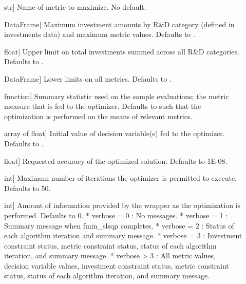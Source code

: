 \documentclass[letterpaper,10pt,english]{sphinxmanual}
\begin{document}
\begin{description}
\item[{}] \leavevmode{[}str{]}
Name of metric to maximize. No default.

\item[{}] \leavevmode{[}DataFrame{]}
Maximum investment amounts by R\&D category (defined in investments
data) and maximum metric values. Defaults to .

\item[{}] \leavevmode{[}float{]}
Upper limit on total investments summed across all R\&D categories.
Defaults to .

\item[{}] \leavevmode{[}DataFrame{]}
Lower limits on all metrics. Defaults to .

\item[{}] \leavevmode{[}function{]}
Summary statistic used on the sample evaluations; the metric measure
that is fed to the optimizer. Defaults to  such that the
optimization is performed on the means of relevant metrics.

\item[{}] \leavevmode{[}array of float{]}
Initial value of decision variable(s) fed to the optimizer. Defaults
to .

\item[{}] \leavevmode{[}float{]}
Requested accuracy of the optimized solution. Defaults to 1E-08.

\item[{}] \leavevmode{[}int{]}
Maximum number of iterations the optimizer is permitted to execute.
Defaults to 50.

\item[{}] \leavevmode{[}int{]}
Amount of information provided by the wrapper as the optimization is
performed. Defaults to 0.
* verbose = 0 : No messages.
* verbose = 1 : Summary message when fmin\_slsqp completes.
* verbose = 2 : Status of each algorithm iteration and summary message.
* verbose = 3 : Investment constraint status, metric constraint status, status of each algorithm iteration, and summary message.
* verbose \textgreater{} 3 : All metric values, decision variable values, investment constraint status, metric constraint status, status of each algorithm iteration, and summary message.

\end{description}
\end{document}
